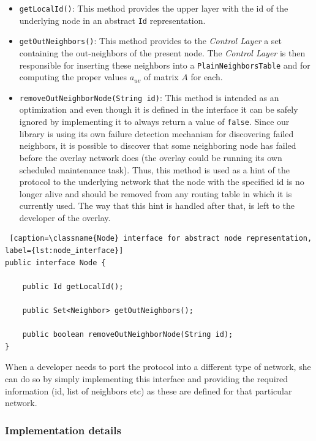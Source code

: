 \documentclass[a4paper,11pt,twoside]{report}
\newcommand{\classname}[1]{\texttt{#1}}
\begin{document}
\begin{itemize}
\item \classname{getLocalId()}: This method provides the upper layer with the id of the underlying node in an abstract \classname{Id} representation.\\
\item \classname{getOutNeighbors()}: This method provides to the \textit{Control Layer} a set containing the out-neighbors of the present node. The \textit{Control Layer} is then responsible for inserting these neighbors into a \classname{PlainNeighborsTable} and for computing the proper values $a_{uv}$ of matrix $A$ for each. \\
\item \classname{removeOutNeighborNode(String id)}: This method is intended as an optimization and even though it is defined in the interface it can be safely ignored by implementing it to always return a value of \classname{false}. Since our library is using its own failure detection mechanism for discovering failed neighbors, it is possible to discover that some neighboring node has failed before the overlay network does (the overlay could be running its own scheduled maintenance task). Thus, this method is used as a hint of the protocol to the underlying network that the node with the specified id is no longer alive and should be removed from any routing table in which it is currently used. The way that this hint is handled after that, is left to the developer of the overlay.\\
\end{itemize}




\begin{lstlisting} [caption=\classname{Node} interface for abstract node representation, label={lst:node_interface}]
public interface Node {

	public Id getLocalId();

	public Set<Neighbor> getOutNeighbors();
	
	public boolean removeOutNeighborNode(String id);
}
\end{lstlisting}

When a developer needs to port the protocol into a different type of network, she can do so by simply implementing this interface and providing the required information (id, list of neighbors etc) as these are defined for that particular network.


\subsubsection*{Implementation details}
\end{document}
